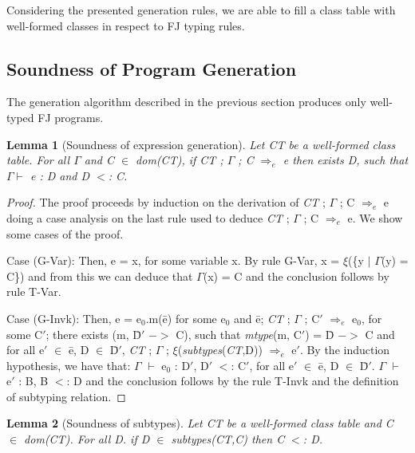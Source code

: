 \documentclass[tese,capa,english]{texufpel}
\newtheorem{lemma}{Lemma}
\begin{document}
\vspace{8pt}

Considering the presented generation rules, we are able to fill a class table with well-formed classes in respect to FJ typing rules.

\subsection{Soundness of Program Generation}

The generation algorithm described in the previous section produces only well-typed FJ programs.

\begin{lemma}[Soundness of expression generation]
\label{lem:fj-seg}
Let \emph{CT} be a well-formed class table. For all $\Gamma$ and C $\in$ dom\emph{(CT)}, if \emph{CT} ; $\Gamma$ ; C $\Rightarrow_e$ e then exists D, such that $\Gamma \vdash$  e : D and D $<$: C.
\end{lemma}

\begin{proof}
The proof proceeds by induction on the derivation of \emph{CT} ; $\Gamma$ ; C $\Rightarrow_e$ e doing a case analysis on the last rule used to deduce \emph{CT} ; $\Gamma$ ; C $\Rightarrow_e$ e. We show some cases of the proof.

\vspace{5pt}

Case (G-Var): Then, e = x, for some variable x. By rule {\footnotesize G-Var}, x = $\xi$(\{y $\mid$ $\Gamma$(y) = C\}) and from this we can deduce that $\Gamma$(x) = C and the conclusion follows by rule {\footnotesize T-Var}.

\vspace{5pt}

Case (G-Invk): Then, e = e$_0$.m(\={e}) for some e$_0$ and \={e}; \emph{CT} ; $\Gamma$ ; C$'$ $\Rightarrow_e$ e$_0$, for some C$'$; there exists (m, \={D}$'$ $->$ C), such that \emph{mtype}(m, C$'$) = \={D} $->$ C and for all e$'$ $\in$ \={e}, D $\in$ \={D}$'$, \emph{CT} ; $\Gamma$ ; $\xi$(\emph{subtypes}(\emph{CT},D)) $\Rightarrow_e$ e$'$. By the induction hypothesis, we have that: $\Gamma$ $\vdash$ e$_0$ : D$'$, D$'$ $<$: C$'$, for all e$'$ $\in$ \={e}, D $\in$ \={D}$'$. $\Gamma$ $\vdash$ e$'$ : B, B $<$: D and the conclusion follows by the rule {\footnotesize T-Invk} and the definition of subtyping relation.
\end{proof}

\begin{lemma}[Soundness of subtypes]
\label{lem:fj-sos}
Let \emph{CT} be a well-formed class table and C $\in$ dom\emph{(CT)}.
For all D. if D $\in$ subtypes\emph{(CT},C\emph{)} then C $<$: D.
\end{lemma}
\end{document}
